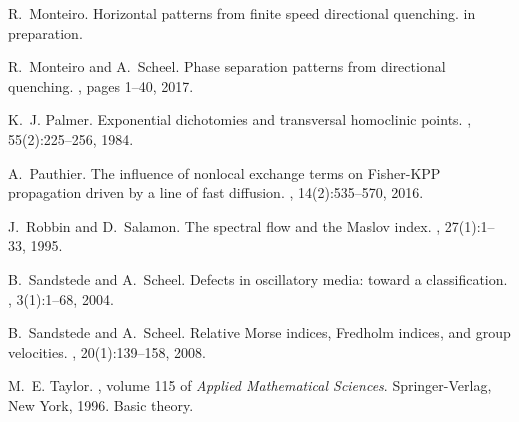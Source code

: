 \documentclass[10pt]{article}
\begin{document}
\begin{thebibliography}{10}
R.~Monteiro.
\newblock Horizontal patterns from finite speed directional quenching.
\newblock in preparation.

R.~Monteiro and A.~Scheel.
\newblock Phase separation patterns from directional quenching.
, pages 1--40, 2017.

K.~J. Palmer.
\newblock Exponential dichotomies and transversal homoclinic points.
, 55(2):225--256, 1984.

A.~Pauthier.
\newblock The influence of nonlocal exchange terms on {F}isher-{KPP}
  propagation driven by a line of fast diffusion.
, 14(2):535--570, 2016.

J.~Robbin and D.~Salamon.
\newblock The spectral flow and the {M}aslov index.
, 27(1):1--33, 1995.

B.~Sandstede and A.~Scheel.
\newblock Defects in oscillatory media: toward a classification.
, 3(1):1--68, 2004.

B.~Sandstede and A.~Scheel.
\newblock Relative {M}orse indices, {F}redholm indices, and group velocities.
, 20(1):139--158, 2008.

M.~E. Taylor.
, volume 115 of {\em Applied
  Mathematical Sciences}.
\newblock Springer-Verlag, New York, 1996.
\newblock Basic theory.

\end{thebibliography}



% 
% 
% 
\end{document}
